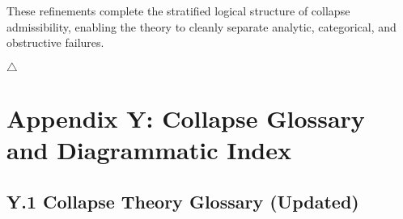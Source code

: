 \documentclass[11pt]{article}
\begin{document}
These refinements complete the stratified logical structure of collapse admissibility, enabling the theory to cleanly separate analytic, categorical, and obstructive failures.

\hfill \( \triangle \)




\appendix
\section*{Appendix Y: Collapse Glossary and Diagrammatic Index}

\subsection*{Y.1 Collapse Theory Glossary (Updated)}
\end{document}
